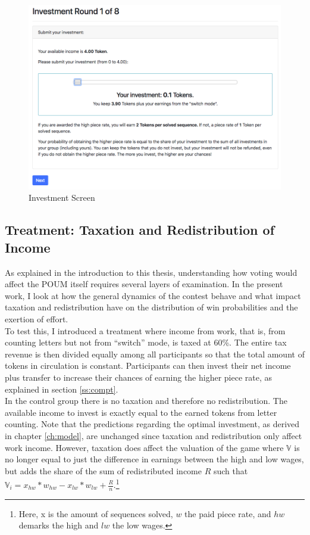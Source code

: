     \begin{figure}
        \centering
        \includegraphics[width=\textwidth]{graphs/screen_invest.png}
        \caption{Investment Screen}
        \label{fig:screen_invest}
    \end{figure}
    
    
    \subsection{Treatment: Taxation and Redistribution of Income}
    \label{sec:treat}
    
    As explained in the introduction to this thesis, understanding how voting would affect the POUM itself requires several layers of examination. In the present work, I look at how the general dynamics of the contest behave and what impact taxation and redistribution have on the distribution of win probabilities and the exertion of effort.\\
    
    To test this, I introduced a treatment where income from work, that is, from counting letters but not from ``switch'' mode, is taxed at 60\%. The entire tax revenue is then divided equally among all participants so that the total amount of tokens in circulation is constant. Participants can then invest their net income plus transfer to increase their chances of earning the higher piece rate, as explained in section \ref{ss:compt}.\\
    
    In the control group there is no taxation and therefore no redistribution. The available income to invest is exactly equal to the earned tokens from letter counting. Note that the predictions regarding the optimal investment, as derived in chapter \ref{ch:model}, are unchanged since taxation and redistribution only affect work income. However, taxation does affect the valuation of the game where $\mathbb{V}$ is no longer equal to just the difference in earnings between the high and low wages, but adds the share of the sum of redistributed income $R$ such that $\mathbb{V}_i = x_{hw}*w_{hw} - x_{lw}*w_{lw} + \frac{R}{n}$.\footnote{Here, x is the amount of sequences solved, $w$ the paid piece rate, and $hw$ demarks the high and $lw$ the low wages.}  
    
